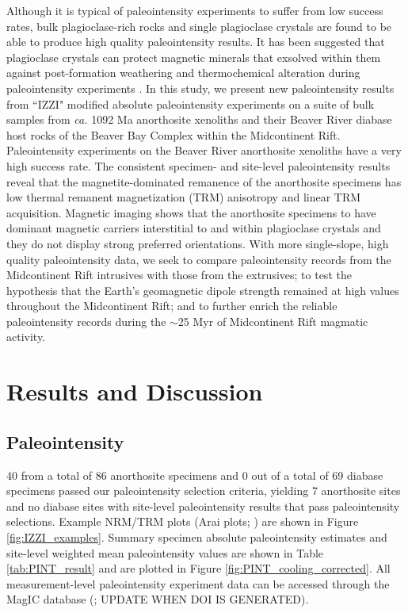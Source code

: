 \documentclass[9pt,twocolumn,twoside,lineno]{pnas-new}
\begin{document}
Although it is typical of paleointensity experiments to suffer from low success rates, bulk plagioclase-rich rocks \cite{Selkin2000a} and single plagioclase crystals \cite{Tarduno2005a} are found to be able to produce high quality paleointensity results. It has been suggested that plagioclase crystals can protect magnetic minerals that exsolved within them against post-formation weathering and thermochemical alteration during paleointensity experiments \cite{Tarduno2005a}. In this study, we present new paleointensity results from ``IZZI" modified absolute paleointensity experiments \cite{Yu2004a} on a suite of bulk samples from \textit{ca.} 1092 Ma anorthosite xenoliths and their Beaver River diabase host rocks of the Beaver Bay Complex within the Midcontinent Rift. Paleointensity experiments on the Beaver River anorthosite xenoliths have a very high success rate. The consistent specimen- and site-level paleointensity results reveal that the magnetite-dominated remanence of the anorthosite specimens has low thermal remanent magnetization (TRM) anisotropy and linear TRM acquisition. Magnetic imaging shows that the anorthosite specimens to have dominant magnetic carriers interstitial to and within plagioclase crystals and they do not display strong preferred orientations. With more single-slope, high quality paleointensity data, we seek to compare paleointensity records from the Midcontinent Rift intrusives with those from the extrusives; to test the hypothesis that the Earth's geomagnetic dipole strength remained at high values throughout the Midcontinent Rift; and to further enrich the reliable paleointensity records during the $\sim$25 Myr of Midcontinent Rift magmatic activity. 

\section*{Results and Discussion}

\subsection*{Paleointensity}

40 from a total of 86 anorthosite specimens and 0 out of a total of 69 diabase specimens passed our paleointensity selection criteria, yielding 7 anorthosite sites and no diabase sites with site-level paleointensity results that pass paleointensity selections. Example NRM/TRM plots (Arai plots; 
\cite{Arai1963a}) are shown in Figure \ref{fig:IZZI_examples}. Summary specimen absolute paleointensity estimates and site-level weighted mean paleointensity values are shown in Table \ref{tab:PINT_result} and are plotted in Figure \ref{fig:PINT_cooling_corrected}. All measurement-level paleointensity experiment data can be accessed through the MagIC database (\url{}; UPDATE WHEN DOI IS GENERATED). 
\end{document}
